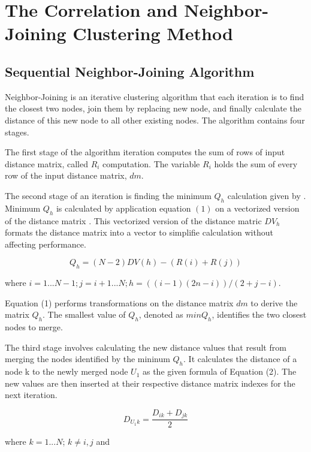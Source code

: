 \chapter{The Correlation and Neighbor-Joining Clustering Method}

\section{Sequential Neighbor-Joining Algorithm}

Neighbor-Joining is an iterative clustering algorithm that each iteration is to find the closest two nodes, join them by replacing new node, and finally calculate the distance of this new node to all other existing nodes. The algorithm contains four stages. 

The first stage of the algorithm iteration computes the sum of rows of input distance matrix, called $R_i$ computation. The variable $R_i$ holds the sum of every row of the input  distance matrix, $dm$. 

The second stage of an iteration is finding the minimum $Q_h$ calculation given by \cite{al2014accelerated}. Minimum $Q_h$ is calculated by application equation $(1)$ on a vectorized version of the distance matrix \cite{fastvectorizeddm}. This vectorized version of the distance matric $DV_{h}$ formats the distance matrix into a vector to simplifie calculation without affecting performance.

\begin{equation}
Q_h=(N-2)DV(h)-(R(i)+R(j))
\end{equation}

where $i=1...N-1; j=i+1...N; h = ((i-1)(2n-i)) / (2+j-i)$. 

Equation (1) performs transformations on the distance matrix $dm$ to derive the matrix $Q_{h}$. The smallest value of $Q_{h}$, denoted as $min Q_{h}$, identifies the two closest nodes to merge. 

The third stage involves calculating the new distance values that result from merging the nodes identified by the mininum $Q_{h}$. It calculates the distance of a node {k} to the newly merged node $U_{1}$ as the given formula of Equation (2). The new values are then inserted at their respective distance matrix indexes for the next iteration. 

\begin{equation}
D_{U_{1}k} = \frac{D_{ik}+D_{jk}}{2}
\end{equation}

where $k = 1...N$; $k \neq i,j$ and 

